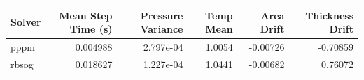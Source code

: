 \begin{tabular}{lrrrrr}
\toprule
Solver & Mean Step Time (s) & Pressure Variance & Temp Mean & Area Drift & Thickness Drift \\
\midrule
pppm & 0.004988 & 2.797e-04 & 1.0054 & -0.00726 & -0.70859 \\
rbsog & 0.018627 & 1.227e-04 & 1.0441 & -0.00682 & 0.76072 \\
\bottomrule
\end{tabular}
